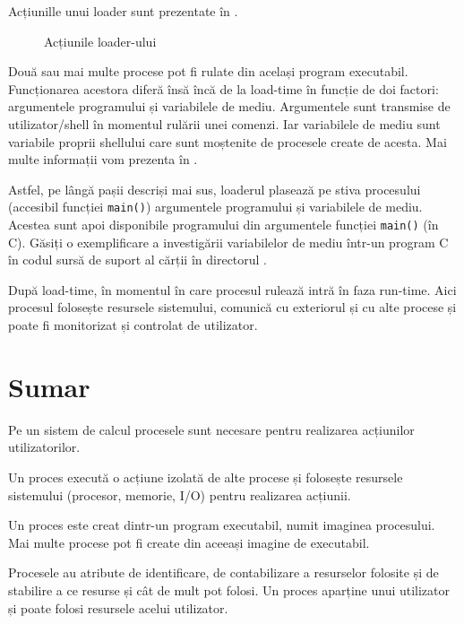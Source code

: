 Acțiunille unui loader sunt prezentate în .

\begin{figure}[!htbp]
  \centering
  \def\svgwidth{0.8\textwidth}
  
  \caption{Acțiunile loader-ului}
  \label{fig:process:loader}
\end{figure}

Două sau mai multe procese pot fi rulate din același program executabil.
Funcționarea acestora diferă însă încă de la load-time în funcție de doi factori: argumentele programului și variabilele de mediu.
Argumentele sunt transmise de utilizator/shell în momentul rulării unei comenzi.
Iar variabilele de mediu sunt variabile proprii shellului care sunt moștenite de procesele create de acesta.
Mai multe informații vom prezenta în .

Astfel, pe lângă pașii descriși mai sus, loaderul plasează pe stiva procesului (accesibil funcției \texttt{main()}) argumentele programului și variabilele de mediu.
Acestea sunt apoi disponibile programului din argumentele funcției \texttt{main()} (în C).
Găsiți o exemplificare a investigării variabilelor de mediu într-un program C în codul sursă de suport al cărții în directorul .

După load-time, în momentul în care procesul rulează intră în faza run-time.
Aici procesul folosește resursele sistemului, comunică cu exteriorul și cu alte procese și poate fi monitorizat și controlat de utilizator.

\section{Sumar}
\label{sec:process:summary}

Pe un sistem de calcul procesele sunt necesare pentru realizarea acțiunilor utilizatorilor.

Un proces execută o acțiune izolată de alte procese și folosește resursele sistemului (procesor, memorie, I/O) pentru realizarea acțiunii.

Un proces este creat dintr-un program executabil, numit imaginea procesului.
Mai multe procese pot fi create din aceeași imagine de executabil.

Procesele au atribute de identificare, de contabilizare a resurselor folosite și de stabilire a ce resurse și cât de mult pot folosi.
Un proces aparține unui utilizator și poate folosi resursele acelui utilizator.

